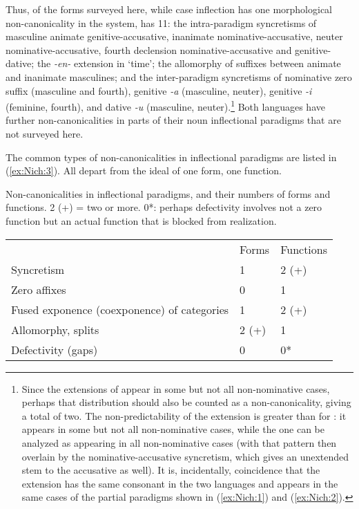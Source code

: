 \documentclass[output=collectionpaper]{langsci/langscibook}
\begin{document}
Thus, of the forms surveyed here, while  case inflection has one morphological non-canonicality in the system,  has 11: the intra-paradigm syncretisms of masculine animate genitive-accusative, inanimate nominative\hyp{}accusative, neuter nominative\hyp{}accusative, fourth declension nominative-accusative and genitive\hyp{}dative; the \textit{-en-} extension in `time'; the allomorphy of suffixes between animate and inanimate masculines; and the inter-paradigm syncretisms of nominative zero suffix (masculine and fourth), genitive \textit{-a} (masculine, neuter), genitive \textit{-i} (feminine, fourth), and dative \textit{-u} (masculine, neuter).\footnote{%
Since the extensions of  appear in some but not all non-nominative cases, perhaps that distribution should also be counted as a non-canonicality, giving  a total of two. The non-predictability of the  extension is greater than for : it appears in some but not all non-nominative cases, while the  one can be analyzed as appearing in all non-nominative cases (with that pattern then overlain by the nominative-accusative syncretism, which gives an unextended stem to the accusative as well). It is, incidentally, coincidence that the extension has the same consonant in the two languages and appears in the same cases of the partial paradigms shown in (\ref{ex:Nich:1}) and (\ref{ex:Nich:2}).
} %
Both languages have further non-canonicalities in parts of their noun inflectional paradigms that are not surveyed here.

The common types of non-canonicalities in inflectional paradigms are listed in (\ref{ex:Nich:3}). All depart from the ideal of one form, one function.

\ea
\label{ex:Nich:3}
Non-canonicalities in inflectional paradigms, and their numbers of forms and functions.  2 (+) = two or more. 0*: perhaps defectivity involves not a zero function but an actual function that is blocked from realization.\\
\medskip
\begin{tabular}{lll}
						&		Forms &	Functions	\\
	Syncretism	 &					1 &	2 (+)	\\
	Zero affixes	 &					0 &	1	\\
	Fused exponence (coexponence) of categories	 &1 &	2 (+)	\\
	Allomorphy, splits		 &			2 (+)	 &1	\\
	Defectivity (gaps)		 &			0 &	0*
\end{tabular}
\z
\end{document}
